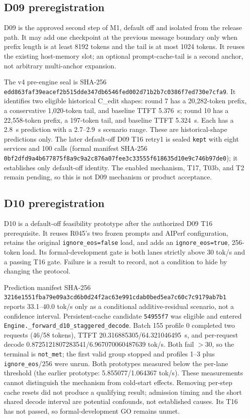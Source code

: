 \documentclass[11pt]{article}
\begin{document}
\subsection{D09 preregistration}

D09 is the approved second step of M1, default off and isolated from the release path. It may add one checkpoint at the previous message boundary only when prefix length is at least 8192 tokens and the tail is at most 1024 tokens. It reuses the existing host-memory slot; an optional prompt-cache-tail is a second anchor, not arbitrary multi-anchor expansion.

The v4 pre-engine seal is SHA-256 \texttt{edd863faf39eacef2b515dde347db6546fed002d71b2b7c0386f7ed730e7cfa9}. It identifies two eligible historical C\_edit shapes: round 7 has a 20,282-token prefix, a conservative 1,020-token tail, and baseline TTFT 5.376~s; round 10 has a 22,558-token prefix, a 197-token tail, and baseline TTFT 5.324~s. Each has a 2.8~s prediction with a 2.7--2.9~s scenario range. These are historical-shape predictions only. The later default-off D09 T16 retry1 is sealed \texttt{kept} with eight services and 100 calls (formal manifest SHA-256 \texttt{0bf2dfd9a4b677875f8a9c9a2c876a07fee3c33555f618635d10e9c746b97de0}); it establishes only default-off identity. The enabled mechanism, T17, T03b, and T2 remain pending, so this is not D09 mechanism or product acceptance.

\subsection{D10 preregistration}

D10 is a default-off feasibility prototype after the authorized D09 T16 prerequisite. It reuses R045's two frozen prompts and AIPerf configuration, retains the original \texttt{ignore\_eos=false} load, and adds an \texttt{ignore\_eos=true}, 256-token load. Its formal-development gate is both lanes strictly above 30 tok/s and a passing T16 gate. Failure is a result to record, not a condition to hide by changing the protocol.

Prediction manifest SHA-256 \texttt{3216e1551fba79e09a3cd6b0d24f2ac63e991cdab0bed5ea7c60c7c9179ab7b1} reports 33.1--40.0 tok/s only as a conditional additive-residual scenario, not a confidence interval. Persistent-cache candidate \texttt{54955f7} was eligible and entered \texttt{Engine.\_forward\_d10\_staggered\_decode}. Batch 155 profile 0 completed two requests (46/58 tokens), TTFT 20.316885305/64.321046495~s, and per-request decode 0.8725121807283541/6.967070060487639 tok/s. Both fail $>30$, so the terminal is \texttt{not\_met}; the first valid group stopped and profiles 1--3 plus \texttt{ignore\_eos}/256 were unrun. Both prototypes measured below the per-lane threshold (the earlier prototype: 5.855077/1.064367 tok/s). These measurements cannot distinguish the mechanism from cold-start effects. Removing per-step cache resets did not produce a qualifying result; admission timing and the short shared decode interval are potential confounds, not established causes. Its T16 has not passed, so formal-development GO remains unmet.
\end{document}
